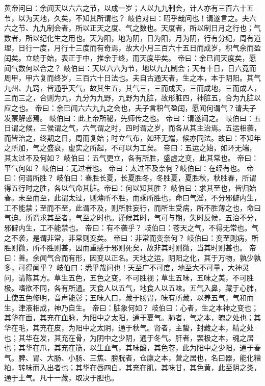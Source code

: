 \documentclass[a4paper,12pt,UTF8,twoside]{ctexbook}
\begin{document}
黄帝问曰：余闻天以六六之节，以成一岁；人以九九制会，计人亦有三百六十五节，以为天地，久矣，不知其所谓也？
岐伯对曰：昭乎哉问也！请遂言之。夫六六之节、九九制会者，所以正天之度、气之数也。天度者，所以制日月之行也；气数者，所以纪化生之用也。天为阳，地为阴，日为阳，月为阴，行有分纪，周有道理，日行一度，月行十三度而有奇焉，故大小月三百六十五日而成岁，积气余而盈闰矣。立端于始，表正于中，推余于终，而天度毕矣。
帝曰：余已闻天度矣，愿闻气数何以合之？
岐伯曰：天以六六为节，地以九九制会；天有十日，日六竟而周甲，甲六复而终岁，三百六十日法也。夫自古通天者，生之本，本于阴阳。其气九州、九窍，皆通乎天气，故其生五，其气三，三而成天，三而成地，三而成人，三而三之，合则为九，九分为九野，九野为九脏，故形脏四，神脏五，合为九脏以应之也。
帝曰：余已闻六六九九之会也，夫子言积气盈闰，愿闻何谓气？请夫子发蒙解惑焉。
岐伯曰：此上帝所秘，先师传之也。
帝曰：请遂闻之。
岐伯曰：五日谓之候，三候谓之气，六气谓之时，四时谓之岁，而各从其主治焉。五运相袭，而皆治之，终期之日，周而复始；时立气布，如环无端，候亦同法。故曰：不知年之所加，气之盛衰，虚实之所起，不可以为工矣。
帝曰：五运之始，如环无端，其太过不及何如？
岐伯曰：五气更立，各有所胜，盛虚之变，此其常也。
帝曰：平气何如？
岐伯曰：无过者也。
帝曰：太过不及奈何？岐伯曰：在经有也。
帝曰：何谓所胜？
岐伯曰：春胜长夏，长夏胜冬，冬胜夏，夏胜秋，秋胜春，所谓得五行时之胜，各以气命其脏。帝曰：何以知其胜？
岐伯曰：求其至也，皆归始春。未至而至，此谓太过，则薄所不胜，而乘所胜也，命曰气淫，不分邪僻内生，工不能禁；至而不至，此谓不及，则所胜妄行，而所生受病，所不胜薄之也，命曰气迫。所谓求其至者，气至之时也。谨候其时，气可与期，失时反候，五治不分，邪僻内生，工不能禁也。
帝曰：有不袭乎？
岐伯曰：苍天之气，不得无常也。气之不袭，是谓非常，非常则变矣。
帝曰：非常而变奈何？
岐伯曰：变至则病，所胜则微，所不胜则甚，因而重感于邪则死矣，故非其时则微，当其时则甚也。
帝曰：善。余闻气合而有形，因变以正名。天地之运，阴阳之化，其于万物，孰少孰多，可得闻乎？
岐伯曰：悉乎哉问也！天至广不可度，地至大不可量，大神灵问，请陈其方。草生五色，五色之变，不可胜视；草生五味，五味之美，不可胜极。嗜欲不同，各有所通。天食人以五气，地食人以五味。五气入鼻，藏于心肺，上使五色修明，音声能彰；五味入口，藏于肠胃，味有所藏，以养五气，气和而生，津液相成，神乃自生。
帝曰：脏象何如？
岐伯曰：心者，生之本神之变也；其华在面，其充在血脉，为阳中之太阳，通于夏气。肺者，气之本，魄之处也；其华在毛，其充在皮，为阳中之太阴，通于秋气。肾者，主蛰，封藏之本，精之处也；其华在发，其充在骨，为阴中之少阴，通于冬气。肝者，罢极之本，魂之居也；其华在爪，其充在筋，以生血气，其味酸，其色苍，此为阳中之少阳，通于春气。脾、胃、大肠、小肠、三焦、膀胱者，仓廪之本，营之居也，名曰器，能化糟粕，转味而入出者也；其华在唇四白，其充在肌，其味甘，其色黄，此至阴之类，通于土气。凡十一藏，取决于胆也。
\end{document}
